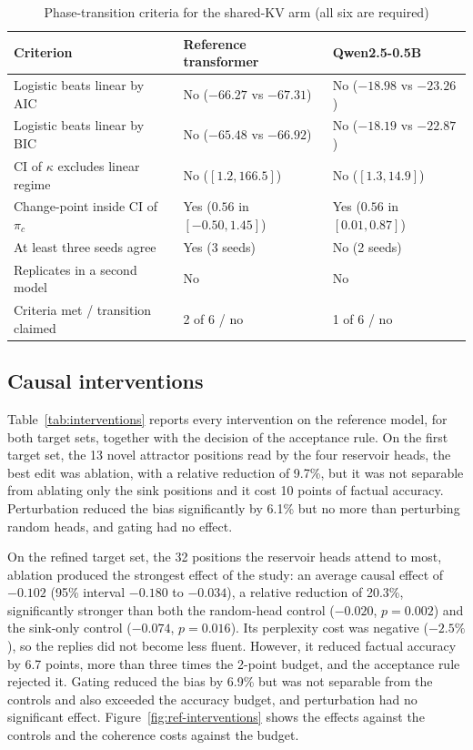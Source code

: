 \begin{table}[htbp]
\centering
\caption{Phase-transition criteria for the shared-KV arm (all six are required)}\label{tab:phase}
\small
\begin{tabularx}{\textwidth}{@{}YL{4.2cm}L{4.2cm}@{}}
\toprule
\textbf{Criterion} & \textbf{Reference transformer} & \textbf{Qwen2.5-0.5B} \\
\midrule
Logistic beats linear by AIC & No ($-66.27$ vs $-67.31$) & No ($-18.98$ vs $-23.26$) \\
Logistic beats linear by BIC & No ($-65.48$ vs $-66.92$) & No ($-18.19$ vs $-22.87$) \\
CI of $\kappa$ excludes linear regime & No ($[1.2, 166.5]$) & No ($[1.3, 14.9]$) \\
Change-point inside CI of $\pi_c$ & Yes ($0.56$ in $[-0.50, 1.45]$) & Yes ($0.56$ in $[0.01, 0.87]$) \\
At least three seeds agree & Yes (3 seeds) & No (2 seeds) \\
Replicates in a second model & No & No \\
\midrule
Criteria met / transition claimed & 2 of 6 / no & 1 of 6 / no \\
\bottomrule
\end{tabularx}
\end{table}

\subsection{Causal interventions}
Table~\ref{tab:interventions} reports every intervention on the reference model, for both target sets, together with the decision of the acceptance rule. On the first target set, the 13 novel attractor positions read by the four reservoir heads, the best edit was ablation, with a relative reduction of 9.7\%, but it was not separable from ablating only the sink positions and it cost 10 points of factual accuracy. Perturbation reduced the bias significantly by 6.1\% but no more than perturbing random heads, and gating had no effect.

On the refined target set, the 32 positions the reservoir heads attend to most, ablation produced the strongest effect of the study: an average causal effect of $-0.102$ (95\% interval $-0.180$ to $-0.034$), a relative reduction of 20.3\%, significantly stronger than both the random-head control ($-0.020$, $p = 0.002$) and the sink-only control ($-0.074$, $p = 0.016$). Its perplexity cost was negative ($-2.5\%$), so the replies did not become less fluent. However, it reduced factual accuracy by 6.7 points, more than three times the 2-point budget, and the acceptance rule rejected it. Gating reduced the bias by 6.9\% but was not separable from the controls and also exceeded the accuracy budget, and perturbation had no significant effect. Figure~\ref{fig:ref-interventions} shows the effects against the controls and the coherence costs against the budget.

